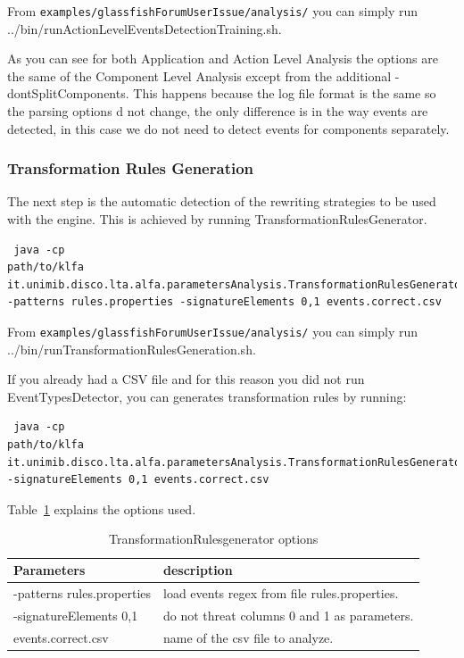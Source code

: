 From \texttt{examples/glassfishForumUserIssue/analysis/} you can simply run
../bin/runActionLevelEventsDetectionTraining.sh.

As you can see for both Application and Action Level Analysis the
options are the same of the Component Level Analysis except from the
additional -dontSplitComponents. This happens because the log file
format is the same so the parsing options d not change, the only
difference is in the way events are detected, in this case we do not
need to detect events for components separately.

\subsubsection{Transformation Rules Generation}

The next step is the automatic detection of the rewriting strategies
to be used with the engine. This is achieved by running
TransformationRulesGenerator.

\begin{verbatim}
 java -cp
path/to/klfa
it.unimib.disco.lta.alfa.parametersAnalysis.TransformationRulesGenerator
-patterns rules.properties -signatureElements 0,1 events.correct.csv
\end{verbatim}

From \texttt{examples/glassfishForumUserIssue/analysis/} you can simply run
../bin/runTransformationRulesGeneration.sh.

If you already had a CSV file and for this reason you did not run
EventTypesDetector, you can generates transformation rules by running:

\begin{verbatim}
 java -cp
path/to/klfa
it.unimib.disco.lta.alfa.parametersAnalysis.TransformationRulesGenerator
-signatureElements 0,1 events.correct.csv
\end{verbatim}

Table~\ref{trg} explains the options used.

\begin{table}
 \begin{tabular}{|p{6cm}|p{4cm}|}
 \hline
Parameters&description\\
\hline
-patterns rules.properties&load events regex from file
rules.properties.\\
\hline
-signatureElements 0,1&do not threat columns 0 and 1 as parameters.\\
\hline
events.correct.csv& name of the csv file to analyze.\\
\hline
\end{tabular}
\label{trg}
\caption{TransformationRulesgenerator options}
\end{table}


